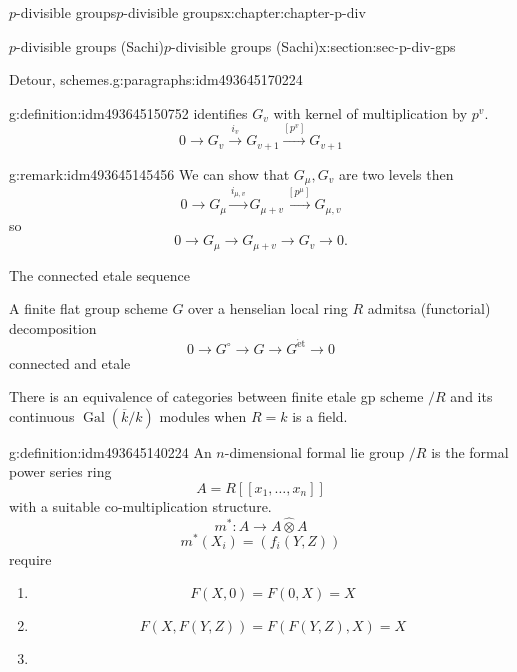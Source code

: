 \documentclass[oneside,10pt,]{book}
\numberwithin{equation}{section}
\newcommand{\lb}{[}
\newcommand{\rb}{]}
\newcommand{\et}{\mathrm{\acute{e}t}}
\newcommand{\absgal}[1]{\operatorname{Gal}(\overline{#1}/#1)}
\begin{document}
\begin{chapterptx}{\(p\)-divisible groups}{}{\(p\)-divisible groups}{}{}{x:chapter:chapter-p-div}
\begin{sectionptx}{\(p\)-divisible groups (Sachi)}{}{\(p\)-divisible groups (Sachi)}{}{}{x:section:sec-p-div-gps}
\begin{paragraphs}{Detour, schemes.}{g:paragraphs:idm493645170224}
\begin{definition}{}{g:definition:idm493645150752}
identifies \(G_v\) with kernel of multiplication by \(p^v\).%
\begin{equation*}
0 \to G_v \xrightarrow{i_v} G_{v+1} \xrightarrow{[p^v]} G_{v+1}
\end{equation*}
%
\end{definition}
\begin{remark}{}{g:remark:idm493645145456}%
We can show that \(G_\mu,G_v\) are two levels then%
\begin{equation*}
0 \to G_\mu \xrightarrow{i_{\mu, v}} G_{\mu +v } \xrightarrow{[p^\mu]} G_{\mu,v}
\end{equation*}
so%
\begin{equation*}
0 \to G_\mu \to G_{\mu + v}  \to G_v \to 0\text{.}
\end{equation*}
%
\end{remark}
The connected etale sequence%
\par
A finite flat group scheme \(G\) over a henselian local ring \(R\) admitsa (functorial) decomposition%
\begin{equation*}
0  \to G^\circ \to G \to G^\et \to 0
\end{equation*}
connected and etale%
\par
There is an equivalence of categories between finite etale gp scheme \(/R\) and its continuous \(\absgal k\) modules when \(R = k\) is a field.%
\begin{definition}{}{g:definition:idm493645140224}%
An \(n\)-dimensional formal lie group \(/R\) is the formal power series ring%
\begin{equation*}
A = R\lb \lb x_1, \ldots, x_n \rb\rb
\end{equation*}
with a suitable co-multiplication structure.%
\begin{equation*}
m^* \colon A \to A\widehat \otimes A
\end{equation*}
%
\begin{equation*}
m^*(X_i) = (f_i(Y,Z))
\end{equation*}
require%
\begin{enumerate}
\item{}%
\begin{equation*}
F(X,0) = F(0,X) = X
\end{equation*}
%
\item{}%
\begin{equation*}
F(X,F(Y,Z)) = F(F(Y,Z),X) = X
\end{equation*}
%
\item{}%
\begin{equation*}

\end{equation*}
\end{enumerate}
\end{definition}
\end{paragraphs}
\end{sectionptx}
\end{chapterptx}
\end{document}
